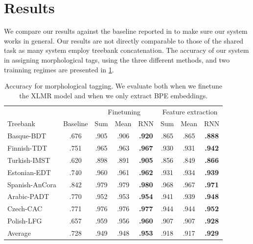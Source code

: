 \documentclass[11pt]{article}
\begin{document}
	
	\section{Results}
	\label{results}

                We compare our results against the baseline reported
     in \cite{mccarthy2019sigmorphon} to make sure our system works in
     general. Our results are not directly comparable to those of the
     shared task as many system employ treebank concatenation.
        The accuracy of our system in assigning morphological tags,
     using the three different methods, and two trainning regimes are
     presented in \cref{tab:results_tokens}.

	\begin{table}[h]
	\centering
	\begin{tabular}{l|c|ccc|ccc}
		& & \multicolumn{3}{c}{Finetuning} & \multicolumn{3}{c}{Feature extraction} \\
		Treebank & Baseline & Sum & Mean & RNN & Sum & Mean & RNN \\
		\hline
        Basque-BDT      & .676 & .905 & .906 & \textbf{.920} & .865 & .865 & \textbf{.888} \\
		Finnish-TDT     & .751 & .965 & .963 & \textbf{.967} & .930 & .931 & \textbf{.942} \\ 
		Turkish-IMST    & .620 & .898 & .891 & \textbf{.905} & .856 & .849 & \textbf{.866}\\
		Estonian-EDT    & .740 & .960 & .961 & \textbf{.962} & .931 & .934 & \textbf{.939} \\
		Spanish-AnCora  & .842 & .979 & .979 & \textbf{.980} & .968 & .967 & \textbf{.971} \\
		Arabic-PADT     & .770 & .952 & .953 & \textbf{.954} & .941 & .939 & \textbf{.948} \\
		Czech-CAC       & .771 & .976 & .976 & \textbf{.977} & .944 & .944 & \textbf{.952} \\
		Polish-LFG      & .657 & .959 & .956 & \textbf{.960} & .907 & .907 & \textbf{.928} \\
        \hline
        Average         & .728 & .949 & .948 & \textbf{.953} & .918 & .917 & \textbf{.929} \\
	\end{tabular}
	\caption{\label{tab:results_tokens} Accuracy for morphological tagging. We evaluate both when we finetune the XLMR model and when we only extract BPE embeddings.}
	\end{table}
\end{document}
